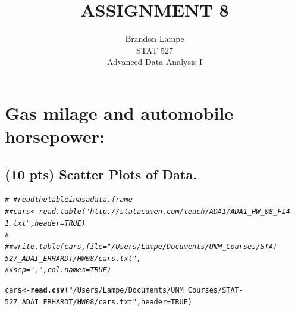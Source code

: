 \documentclass{article}\usepackage[]{graphicx}\usepackage[]{color}
\makeatletter
\newcommand{\hlnum}[1]{\textcolor[rgb]{0.686,0.059,0.569}{#1}}%
\newcommand{\hlstr}[1]{\textcolor[rgb]{0.192,0.494,0.8}{#1}}%
\newcommand{\hlcom}[1]{\textcolor[rgb]{0.678,0.584,0.686}{\textit{#1}}}%
\newcommand{\hlstd}[1]{\textcolor[rgb]{0.345,0.345,0.345}{#1}}%
\newcommand{\hlkwb}[1]{\textcolor[rgb]{0.69,0.353,0.396}{#1}}%
\newcommand{\hlkwc}[1]{\textcolor[rgb]{0.333,0.667,0.333}{#1}}%
\newcommand{\hlkwd}[1]{\textcolor[rgb]{0.737,0.353,0.396}{\textbf{#1}}}%
\newenvironment{kframe}{%
 \def\at@end@of@kframe{}%
 \ifinner\ifhmode%
  \def\at@end@of@kframe{\end{minipage}}%
  \begin{minipage}{\columnwidth}%
 \fi\fi%
 \def\FrameCommand##1{\hskip\@totalleftmargin \hskip-\fboxsep
 \colorbox{shadecolor}{##1}\hskip-\fboxsep
     \hskip-\linewidth \hskip-\@totalleftmargin \hskip\columnwidth}%
 \MakeFramed {\advance\hsize-\width
   \@totalleftmargin\z@ \linewidth\hsize
   \@setminipage}}%
 {\par\unskip\endMakeFramed%
 \at@end@of@kframe}
\newenvironment{knitrout}{}{} %
\makeatother
\begin{document}
\title{ASSIGNMENT 8}
\author{Brandon Lampe \\ STAT 527 \\ Advanced Data Analysis I}
\maketitle



\section{Gas milage and automobile horsepower:}
\subsection{(10 pts) Scatter Plots of Data.}

\begin{knitrout}
\color{fgcolor}\begin{kframe}
\begin{alltt}
\hlcom{# ￼# read the table in as a data.frame}
\hlcom{# # cars <- read.table("http://statacumen.com/teach/ADA1/ADA1_HW_08_F14-1.txt", header=TRUE)}
\hlcom{#}
\hlcom{# # write.table(cars, file = "/Users/Lampe/Documents/UNM_Courses/STAT-527_ADAI_ERHARDT/HW08/cars.txt",}
\hlcom{# #       sep = ",", col.names = TRUE)}

\hlstd{cars} \hlkwb{<-} \hlkwd{read.csv}\hlstd{(}\hlstr{"/Users/Lampe/Documents/UNM_Courses/STAT-527_ADAI_ERHARDT/HW08/cars.txt"}\hlstd{,} \hlkwc{header} \hlstd{=} \hlnum{TRUE}\hlstd{)}
\end{alltt}
\end{kframe}
\end{knitrout}
\end{document}

